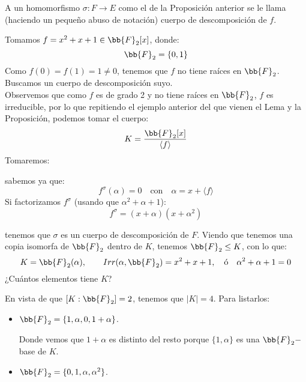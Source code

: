 \begin{definicion}
    A un homomorfismo $\sigma:F\to E$ como el de la Proposición anterior se le llama (haciendo un pequeño abuso de notación) cuerpo de descomposición de $f$.
\end{definicion}

\begin{ejemplo}
    Tomamos $f = x^2+x+1\in \bb{F}_2[x]$, donde:
    \begin{equation*}
        \bb{F}_2 = \{0,1\}
    \end{equation*}
    Como $f(0) = f(1) = 1 \neq 0$, tenemos que $f$ no tiene raíces en $\bb{F}_2$. Buscamos un cuerpo de descomposición suyo.\\

    \noindent
    Observemos que como $f$ es de grado 2 y no tiene raíces en $\bb{F}_2$, $f$ es irreducible, por lo que repitiendo el ejemplo anterior del que vienen el Lema y la Proposición, podemos tomar el cuerpo:
    \begin{equation*}
        K = \dfrac{\bb{F}_2[x]}{\langle f \rangle }
    \end{equation*}
    Tomaremos: 

    sabemos ya que:
    \begin{equation*}
        f^\sigma(\alpha) = 0 \quad \text{con}\quad  \alpha = x+\langle f \rangle 
    \end{equation*}
    Si factorizamos $f^\sigma$ (usando que $\alpha^2 + \alpha+1$):
    \begin{equation*}
        f^\sigma = (x+\alpha)(x+\alpha^2)
    \end{equation*}

    tenemos que $\sigma$ es un cuerpo de descomposición de $F$. Viendo que tenemos una copia isomorfa de $\bb{F}_2$ dentro de $K$, tenemos $\bb{F}_2\leq K$, con lo que:
    \begin{equation*}
        K = \bb{F}_2(\alpha), \qquad Irr(\alpha,\bb{F}_2) = x^2+x+1, \quad \text{ó}\quad \alpha^2 + \alpha+1=0
    \end{equation*}
    ¿Cuántos elementos tiene $K$?

    \noindent
    En vista de que $[K:\bb{F}_2] = 2$, tenemos que $|K| = 4$. Para listarlos:
    \begin{itemize}
        \item $\bb{F}_2 = \{1,\alpha,0,1+\alpha\}$. 

            Donde vemos que $1+\alpha$ es distinto del resto porque $\{1,\alpha\}$ es una $\bb{F}_2-$base de $K$.
        \item $\bb{F}_2 = \{0,1,\alpha,\alpha^2\}$.
    \end{itemize}
\end{ejemplo}

